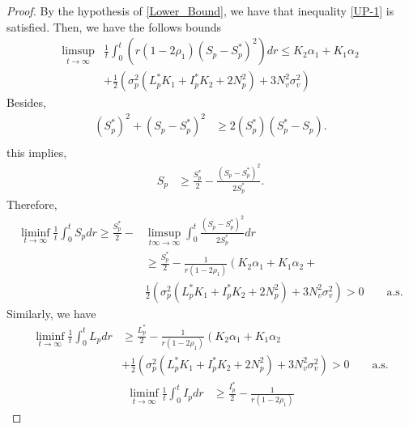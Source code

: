 \begin{proof}
		By the hypothesis of \autoref{Lower_Bound}, 
	we have that inequality \eqref{UP-1} 
	is satisfied. Then, we have the follows bounds
	 \begin{align*}
	 	\limsup
	 		\limits_{t \to \infty}
		 	&
		 	\frac{1}{t}
		 	\int_{0}^{t}
		 	(	r (1 - 2 \rho_1)
		 		\left(
		 			S_p - S_p ^* 
		 		\right) ^2 
		 	)
		 	dr 
		 	\leq 
		 	K_2 \alpha_1 + 
		 	K_1 \alpha_2
		 \\
 		&+
 			\frac{1}{2}
 			\left(
 				\sigma_p^2 
 				(
 					L_p ^* K_1 + 
 					I_p ^ *K_2 + 
 					2 N_p ^ 2
 				) + 
 				3 N_v ^ 2 \sigma_v^2
 			\right)
	\end{align*}
 Besides, 
 \begin{align*}
 	(S_p ^* ) ^ 2 + 
 	(S_p - S_p ^* ) ^ 2
 	&\geq
 	2(S_p ^ *)
 	(S_p ^ * - S_p).
 	\\
 \end{align*}
this implies,
\begin{align*}
	S_p
 		&\geq
 			\frac{S_p ^ *}{2} - 
 			\frac{(S_p - S_p^*)^2}{2 S_p^*}.
\end{align*}
Therefore,
	\begin{align*}
 		\liminf
 		\limits_{t \to \infty}
 		\frac{1}{t}
 		\int_{0} ^ {t} S_p dr
 		\geq
 		\frac{S_p^*}{2}
 		-& 
 		\limsup_{t\infty \to \infty}
 		\int_{0}^{t}
 			\frac{(S_p - S_p ^* )^2}{2S_p^*} 
 		dr
 		\\
	 	&\geq
	 		\frac{S_p^*}{2} - 
	 		\frac{1}{r(1-2\rho_1)}
	 		\left(
	 			K_2 \alpha_1 + 
	 			K_1 \alpha_2
	 		\right. +
 			\\
 			&
 			\frac{1}{2}
 			\left(
 				\sigma_p ^ 2 
 				(
 					L_p ^* K_1 + 
 					I_p ^* K_2 + 2N_p^2
 				) + 
 				3 N_v ^ 2
 				\sigma_v ^ 2
 			\right)
 			>0\qquad\mbox{a.s.}
	\end{align*}
%
	Similarly, we have
	\begin{align*}
	 	\liminf
	 	\limits_{t \to \infty}
	 	\frac{1}{t}\int_{0}^{t} L_p dr
	 	&\geq
	 	\frac{L_p^*}{2} - 
	 	\frac{1}{ r(1 - 2 \rho_1)}
	 	\left(
	 		K_2 \alpha_1 + 
	 		K_1 \alpha_2
	 	\right.
	 	\\
	 	&+
	 	\frac{1}{2}
	 	\left(
	 		\sigma_p^2(
	 			L_p ^ *K_1 + 
	 			I_p ^* K_2 + 
	 			2 N_p ^ 2
	 		) + 
	 		3 N_v ^ 2 \sigma_v ^ 2
	 	\right)
	 	>0 \qquad\mbox{a.s.}
	\end{align*}
	\begin{align*}
	 	\liminf
	 	\limits_{t \to \infty}
	 	\frac{1}{t}
	 	\int_{0} ^ {t} I_p dr
	 	&
	 	\geq
	 	\frac{I_p ^ *}{2} - 
	 	\frac{1}{ r (1 - 2 \rho_1)}

\end{align*}
\end{proof}
